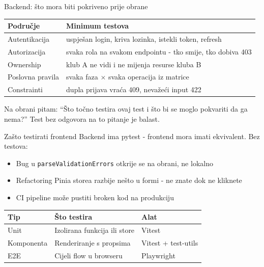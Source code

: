 \begin{frame}{Backend: što mora biti pokriveno prije obrane}
\begin{tabular}{@{}lp{7.2cm}@{}}
  \toprule
  \textbf{Područje} & \textbf{Minimum testova} \\
  \midrule
  Autentikacija & uspješan login, kriva lozinka, istekli token, refresh \\
  Autorizacija & svaka rola na svakom endpointu - tko smije, tko dobiva 403 \\
  Ownership & klub A ne vidi i ne mijenja resurse kluba B \\
  Poslovna pravila & svaka faza $\times$ svaka operacija iz matrice \\
  Constrainti & dupla prijava vraća 409, nevažeći input 422 \\
  \bottomrule
\end{tabular}

\vspace{0.6em}
Na obrani pitam: \enquote{Što točno testira ovaj test i što bi se moglo pokvariti da ga nema?} Test bez odgovora na to pitanje je balast.
\end{frame}

\begin{frame}{Zašto testirati frontend}
Backend ima pytest - frontend mora imati ekvivalent. Bez testova:

\vspace{0.4em}
\begin{itemize}
  \item Bug u \texttt{parseValidationErrors} otkrije se na obrani, ne lokalno
  \item Refactoring Pinia storea razbije nešto u formi - ne znate dok ne kliknete
  \item CI pipeline može pustiti broken kod na produkciju
\end{itemize}

\vspace{0.6em}
\begin{tabular}{@{}lp{5cm}p{4cm}@{}}
  \toprule
  \textbf{Tip} & \textbf{Što testira} & \textbf{Alat} \\
  \midrule
  Unit & Izolirana funkcija ili store & Vitest \\
  Komponenta & Renderiranje s propsima & Vitest + test-utils \\
  E2E & Cijeli flow u browseru & Playwright \\
  \bottomrule
\end{tabular}
\end{frame}

